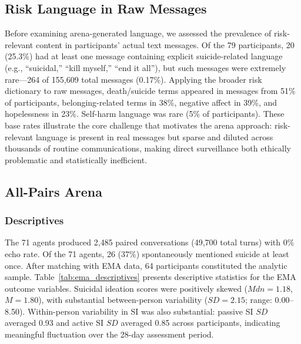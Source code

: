 \documentclass[review,12pt,authoryear]{elsarticle}
\begin{document}
\subsection{Risk Language in Raw Messages}

Before examining arena-generated language, we assessed the prevalence of risk-relevant content in participants' actual text messages. Of the 79 participants, 20 (25.3\%) had at least one message containing explicit suicide-related language (e.g., ``suicidal,'' ``kill myself,'' ``end it all''), but such messages were extremely rare---264 of 155,609 total messages (0.17\%). Applying the broader risk dictionary to raw messages, death/suicide terms appeared in messages from 51\% of participants, belonging-related terms in 38\%, negative affect in 39\%, and hopelessness in 23\%. Self-harm language was rare (5\% of participants). These base rates illustrate the core challenge that motivates the arena approach: risk-relevant language is present in real messages but sparse and diluted across thousands of routine communications, making direct surveillance both ethically problematic and statistically inefficient.

\subsection{All-Pairs Arena}

\subsubsection{Descriptives}

The 71 agents produced 2,485 paired conversations (49,700 total turns) with 0\% echo rate. Of the 71 agents, 26 (37\%) spontaneously mentioned suicide at least once. After matching with EMA data, 64 participants constituted the analytic sample. Table~\ref{tab:ema_descriptives} presents descriptive statistics for the EMA outcome variables. Suicidal ideation scores were positively skewed ($Mdn = 1.18$, $M = 1.80$), with substantial between-person variability ($SD = 2.15$; range: 0.00--8.50). Within-person variability in SI was also substantial: passive SI $SD$ averaged 0.93 and active SI $SD$ averaged 0.85 across participants, indicating meaningful fluctuation over the 28-day assessment period.
\end{document}
